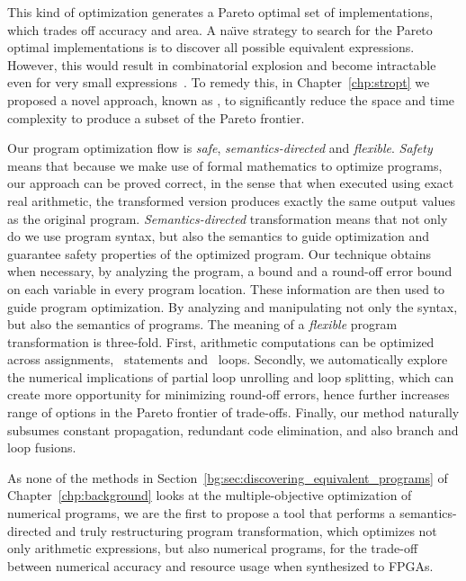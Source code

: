 This kind of optimization generates a Pareto optimal set of implementations,
which trades off accuracy and area.  A na{\"\i}ve strategy to search for
the Pareto optimal implementations is to discover all possible equivalent
expressions.  However, this would result in combinatorial explosion and become
intractable even for very small expressions~\cite{ioualalen,mouilleron}.  To
remedy this, in Chapter~\ref{chp:stropt} we proposed a novel approach, known
as \soap, to significantly reduce the space and time complexity to produce a
subset of the Pareto frontier. 


Our program optimization flow is \emph{safe}, \emph{semantics-directed} and
\emph{flexible}. \emph{Safety} means that because we make use of formal
mathematics to optimize programs, our approach can be proved correct, in
the sense that when executed using exact real arithmetic, the transformed
version produces exactly the same output values as the original program.
\emph{Semantics-directed} transformation means that not only do we use
program syntax, but also the semantics to guide optimization and guarantee
safety properties of the optimized program.  Our technique obtains when
necessary, by analyzing the program, a bound and a round-off error bound on
each variable in every program location.  These information are then used
to guide program optimization.  By analyzing and manipulating not only the
syntax, but also the semantics of programs.  The meaning of a \emph{flexible}
program transformation is three-fold.  First, arithmetic computations can be
optimized across assignments, \iflit~statements and \whilelit~loops.  Secondly,
we automatically explore the numerical implications of partial loop unrolling
and loop splitting, which can create more opportunity for minimizing round-off
errors, hence further increases range of options in the Pareto frontier of
trade-offs.  Finally, our method naturally subsumes constant propagation,
redundant code elimination, and also branch and loop fusions.

As none of the methods in Section~\ref{bg:sec:discovering_equivalent_programs}
of Chapter~\ref{chp:background} looks at the multiple-objective optimization
of numerical programs, we are the first to propose a tool that performs a
semantics-directed and truly restructuring program transformation, which
optimizes not only arithmetic expressions, but also numerical programs, for the
trade-off between numerical accuracy and resource usage when synthesized to
FPGAs.

